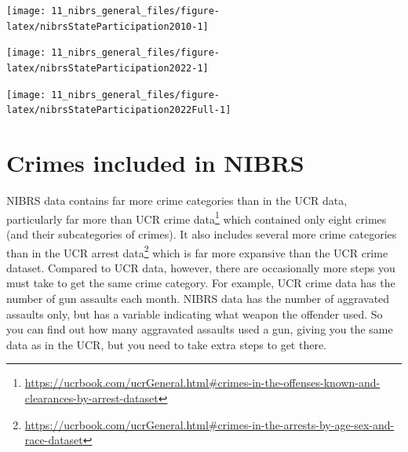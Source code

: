\documentclass[
]{krantz}
\let\origfigure\figure
\let\endorigfigure\endfigure
\renewenvironment{figure}[1][2] {
    \expandafter\origfigure\expandafter[H]
} {
    \endorigfigure
}
\renewcommand{\href}[2]{#2\footnote{\url{#1}}}
\begin{document}
\begin{figure}

{\centering \texttt{[image: 11\_nibrs\_general\_files/figure-latex/nibrsStateParticipation2010-1]} 

}

\caption{The percent of each state's population that is covered by police agencies reporting at least one month of data to NIBRS, 2010}\label{fig:nibrsStateParticipation2010}
\end{figure}

\begin{figure}

{\centering \texttt{[image: 11\_nibrs\_general\_files/figure-latex/nibrsStateParticipation2022-1]} 

}

\caption{The percent of each state's population that is covered by police agencies reporting at least one month of data to NIBRS, 2022}\label{fig:nibrsStateParticipation2022}
\end{figure}

\begin{figure}

{\centering \texttt{[image: 11\_nibrs\_general\_files/figure-latex/nibrsStateParticipation2022Full-1]} 

}

\caption{The percent of each state's population that is covered by police agencies reporting 12 months of data to NIBRS, 2022}\label{fig:nibrsStateParticipation2022Full}
\end{figure}

\section{Crimes included in
NIBRS}\label{crimes-included-in-nibrs}

NIBRS data contains far more crime categories than in the
UCR data, particularly far more than
\href{https://ucrbook.com/ucrGeneral.html\#crimes-in-the-offenses-known-and-clearances-by-arrest-dataset}{UCR
crime data} which contained only eight crimes (and their
subcategories of crimes). It also includes several more
crime categories than in the
\href{https://ucrbook.com/ucrGeneral.html\#crimes-in-the-arrests-by-age-sex-and-race-dataset}{UCR
arrest data} which is far more expansive than the UCR crime
dataset. Compared to UCR data, however, there are
occasionally more steps you must take to get the same crime
category. For example, UCR crime data has the number of gun
assaults each month. NIBRS data has the number of aggravated
assaults only, but has a variable indicating what weapon the
offender used. So you can find out how many aggravated
assaults used a gun, giving you the same data as in the UCR,
but you need to take extra steps to get there.
\end{document}
